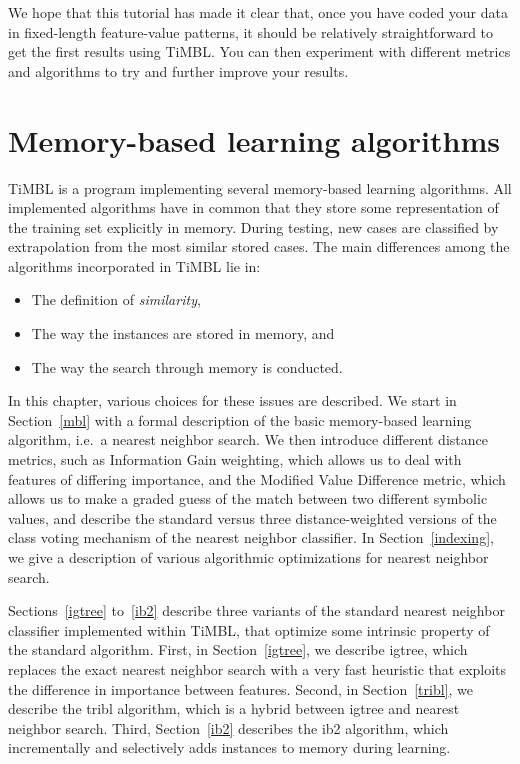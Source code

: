\documentclass{report}
\begin{document}
We hope that this tutorial has made it clear that, once you have coded
your data in fixed-length feature-value patterns, it should be
relatively straightforward to get the first results using TiMBL. You
can then experiment with different metrics and algorithms to try and
further improve your results.

\chapter{Memory-based learning algorithms}
\label{algorithms}

TiMBL is a program implementing several memory-based learning
algorithms. All implemented algorithms have in common that they store some
representation of the training set explicitly in memory. During
testing, new cases are classified by extrapolation from the most
similar stored cases. The main differences among the algorithms
incorporated in TiMBL lie in:

\begin{itemize}
\item The definition of {\em similarity},
\item The way the instances are stored in memory, and
\item The way the search through memory is conducted.
\end{itemize}

In this chapter, various choices for these issues are described. We
start in Section~\ref{mbl} with a formal description of the basic
memory-based learning algorithm, i.e.~a nearest neighbor search. We
then introduce different distance metrics, such as Information Gain
weighting, which allows us to deal with features of differing
importance, and the Modified Value Difference metric, which allows us
to make a graded guess of the match between two different symbolic
values, and describe the standard versus three distance-weighted
versions of the class voting mechanism of the nearest neighbor
classifier. In Section~\ref{indexing}, we give a description of
various algorithmic optimizations for nearest neighbor search.

Sections~\ref{igtree} to~\ref{ib2} describe three variants of the
standard nearest neighbor classifier implemented within TiMBL, that
optimize some intrinsic property of the standard algorithm. First, in
Section~\ref{igtree}, we describe {\sc igtree}, which replaces the
exact nearest neighbor search with a very fast heuristic that exploits
the difference in importance between features. Second, in
Section~\ref{tribl}, we describe the {\sc tribl} algorithm, which is a
hybrid between {\sc igtree} and nearest neighbor search. Third,
Section~\ref{ib2} describes the {\sc ib2} algorithm, which
incrementally and selectively adds instances to memory during
learning.
\end{document}

